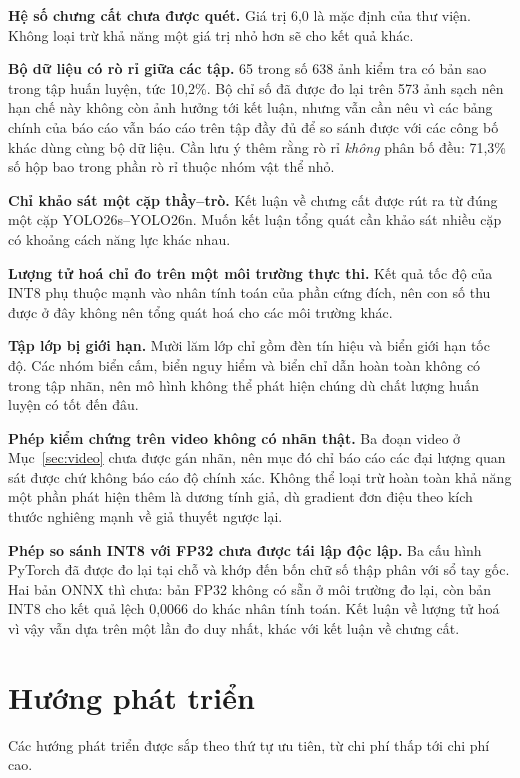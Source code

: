 \textbf{Hệ số chưng cất chưa được quét.} Giá trị 6,0 là mặc định của thư viện. Không loại trừ khả
năng một giá trị nhỏ hơn sẽ cho kết quả khác.

\textbf{Bộ dữ liệu có rò rỉ giữa các tập.} 65 trong số 638 ảnh kiểm tra có bản sao trong tập huấn
luyện, tức 10,2\%. Bộ chỉ số đã được đo lại trên 573 ảnh sạch nên hạn chế này không còn ảnh hưởng
tới kết luận, nhưng vẫn cần nêu vì các bảng chính của báo cáo vẫn báo cáo trên tập đầy đủ để so sánh
được với các công bố khác dùng cùng bộ dữ liệu. Cần lưu ý thêm rằng rò rỉ \emph{không} phân bố đều:
71,3\% số hộp bao trong phần rò rỉ thuộc nhóm vật thể nhỏ.

\textbf{Chỉ khảo sát một cặp thầy--trò.} Kết luận về chưng cất được rút ra từ đúng một cặp
YOLO26s--YOLO26n. Muốn kết luận tổng quát cần khảo sát nhiều cặp có khoảng cách năng lực khác nhau.

\textbf{Lượng tử hoá chỉ đo trên một môi trường thực thi.} Kết quả tốc độ của INT8 phụ thuộc mạnh
vào nhân tính toán của phần cứng đích, nên con số thu được ở đây không nên tổng quát hoá cho các
môi trường khác.

\textbf{Tập lớp bị giới hạn.} Mười lăm lớp chỉ gồm đèn tín hiệu và biển giới hạn tốc độ. Các nhóm
biển cấm, biển nguy hiểm và biển chỉ dẫn hoàn toàn không có trong tập nhãn, nên mô hình không thể
phát hiện chúng dù chất lượng huấn luyện có tốt đến đâu.

\textbf{Phép kiểm chứng trên video không có nhãn thật.} Ba đoạn video ở Mục~\ref{sec:video} chưa
được gán nhãn, nên mục đó chỉ báo cáo các đại lượng quan sát được chứ không báo cáo độ chính xác.
Không thể loại trừ hoàn toàn khả năng một phần phát hiện thêm là dương tính giả, dù gradient đơn
điệu theo kích thước nghiêng mạnh về giả thuyết ngược lại.

\textbf{Phép so sánh INT8 với FP32 chưa được tái lập độc lập.} Ba cấu hình PyTorch đã được đo lại
tại chỗ và khớp đến bốn chữ số thập phân với sổ tay gốc. Hai bản ONNX thì chưa: bản FP32 không có
sẵn ở môi trường đo lại, còn bản INT8 cho kết quả lệch 0,0066 do khác nhân tính toán. Kết luận về
lượng tử hoá vì vậy vẫn dựa trên một lần đo duy nhất, khác với kết luận về chưng cất.

\section{Hướng phát triển}

Các hướng phát triển được sắp theo thứ tự ưu tiên, từ chi phí thấp tới chi phí cao.

